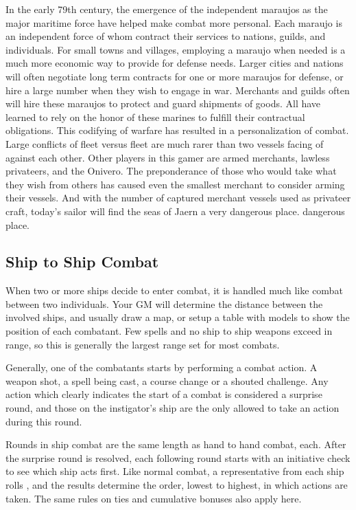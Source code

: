 \begin{multicols*}{2}
In the early 79th century, the emergence of the independent maraujos as the major maritime force have helped make combat more personal. Each maraujo is an independent force of  whom contract their services to nations, guilds, and individuals. For small towns and villages, employing a maraujo when needed is a much more economic way to provide for defense needs. Larger cities and nations will often negotiate long term contracts for one or more maraujos for defense, or hire a large number when they wish to engage in war. Merchants and guilds often will hire these maraujos to protect and guard shipments of goods. All have learned to rely on the honor of these marines to fulfill their contractual obligations.
This codifying of warfare has resulted in a personalization of combat. Large conflicts of fleet versus fleet are much rarer than two vessels facing of against each other. Other players in this gamer are armed merchants, lawless privateers, and the Onivero. The preponderance of those who would take what they wish from others has caused even the smallest merchant to consider arming their vessels. And with the number of captured merchant vessels used as privateer craft, today's sailor will find the seas of Jaern a very dangerous place.
dangerous place.
\subsection{Ship to Ship Combat}
When two or more ships decide to enter combat, it is handled much like combat between two individuals. Your GM will determine the distance between the involved ships, and usually draw a map, or setup a table with models to show the position of each combatant. Few spells and no ship to ship weapons exceed  in range, so this is generally the
largest range set for most combats.

Generally, one of the combatants starts by performing a combat action. A weapon shot, a spell being cast, a course change or a shouted challenge. Any action which clearly indicates the start of a combat is considered a surprise round, and those on the instigator's ship are the
only allowed to take an action during this round.

Rounds in ship combat are the same length as hand to hand combat,  each. After the surprise round is resolved, each following round starts with an initiative check
to see which ship acts first. Like normal combat, a representative from each ship rolls , and the results determine the order, lowest to highest, in which actions are
taken. The same rules on ties and cumulative bonuses also apply here.


\end{multicols*}
